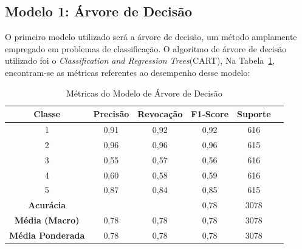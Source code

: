 \documentclass[12pt,oneside,a4paper,chapter=TITLE,
			   english,brazil]{abntex2}
\begin{document}



\vspace{\onelineskip}
\subsection{Modelo 1: Árvore de Decisão}
\vspace{\onelineskip}


O primeiro modelo utilizado será a árvore de decisão, um método amplamente empregado em problemas de classificação. O algoritmo  de árvore de decisão utilizado foi o  \textit{Classification and Regression Trees}(CART), Na Tabela~\ref{tab:my_label}, encontram-se as métricas referentes ao desempenho desse modelo:

\begin{table}[htbp]
    \centering
 \caption[Métricas do Modelo de Árvore de Decisão]{Métricas do Modelo de Árvore de Decisão}
    \begin{tabular}{cccccc}
        \toprule
        \textbf{Classe} & \textbf{Precisão} & \textbf{Revocação} & \textbf{F1-Score} & \textbf{Suporte} \\
        \midrule
        1 & 0,91 & 0,92 & 0,92 & 616 \\
        2 & 0,96 & 0,96 & 0,96 & 615 \\
        3 & 0,55 & 0,57 & 0,56 & 616 \\
        4 & 0,60 & 0,58 & 0,59 & 616 \\
        5 & 0,87 & 0,84 & 0,85 & 615 \\
        \midrule
        \textbf{Acurácia} & & & 0,78 & 3078 \\
        \textbf{Média (Macro)} & 0,78 & 0,78 & 0,78 & 3078 \\
        \textbf{Média Ponderada} & 0,78 & 0,78 & 0,78 & 3078 \\
        \bottomrule
    \end{tabular}

    \label{tab:my_label}
\end{table}
 \begin{flushleft}
\vspace{-2.2em}
\centering
{}
\end{flushleft}
\end{document}
